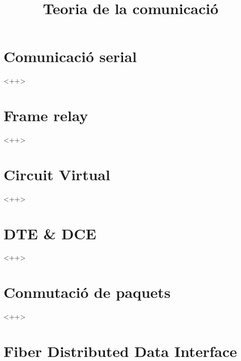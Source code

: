 \documentclass[a4paper]{article}
\begin{document}
\title{Teoria de la comunicació}
\maketitle


%

\begin{comment}
oddsidemargin \the\oddsidemargin \newline
textwidth \the\textwidth \newline
marginparsep \the\marginparsep \newline
marginparwidth \the\marginparwidth \newline
hoffset \the\hoffset \newline
paperwidth \the\paperwidth 
\end{comment}

\section{Comunicació serial}<++>
\section{Frame relay}<++>
\section{Circuit Virtual}<++>
\section{DTE & DCE}<++>
\section{Conmutació de paquets}<++>
\section{Fiber Distributed Data Interface}
\end{document}
